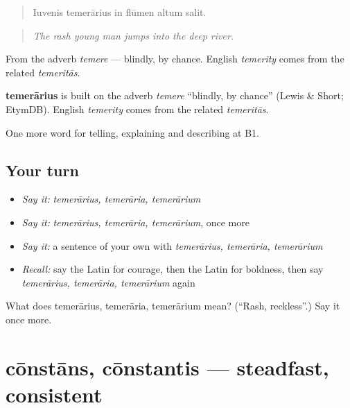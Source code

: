 \begin{quote}
Iuvenis temerārius in flūmen altum salit.
\end{quote}

\begin{quote}
\emph{The rash young man jumps into the deep river.}
\end{quote}

From the adverb \emph{temere} — blindly, by chance. English \emph{temerity} comes from the related \emph{temeritās}.

\begin{cousinweb}
\textbf{temerārius} is built on the adverb \emph{temere} \textquotedblleft{}blindly, by chance\textquotedblright{} (Lewis \& Short; EtymDB). English \emph{temerity} comes from the related \emph{temeritās}.
\end{cousinweb}

\begin{grammarlens}[title={What you've built}]
One more word for telling, explaining and describing at B1.
\end{grammarlens}

\subsection*{Your turn}
\begin{itemize}
\raggedright
  \item \emph{Say it:} \emph{temerārius, temerāria, temerārium}
  \item \emph{Say it:} \emph{temerārius, temerāria, temerārium}, once more
  \item \emph{Say it:} a sentence of your own with \emph{temerārius, temerāria, temerārium}
  \item \emph{Recall:} say the Latin for courage, then the Latin for boldness, then say \emph{temerārius, temerāria, temerārium} again
\end{itemize}

\begin{tcolorbox}[breakable,colback=teal!4,colframe=teal!35!black,title={Before you move on}]
What does temerārius, temerāria, temerārium mean? (\textquotedblleft{}Rash, reckless\textquotedblright{}.) Say it once more.
\end{tcolorbox}
\section[cōnstāns, cōnstantis]{cōnstāns, cōnstantis — steadfast, consistent}

